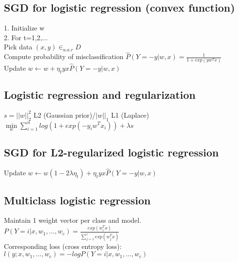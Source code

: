 
\subsection*{SGD for logistic regression (convex function)}
1. Initialize w\\
2. For t=1,2,...\\
Pick data $(x,y) \in_{u.a.r} D$\\
Compute probability of misclassification $\hat{P}(Y = -y|w,x) = \frac{1}{1+exp(yw^Tx)}$\\
Update $w \leftarrow w + \eta_t y x \hat{P}(Y = -y|w,x)$

\subsection*{Logistic regression and regularization}
$s = ||w||_2^2$ L2 (Gaussian prior)/$|w||_1$ L1 (Laplace)\\
$\underset{w}{\operatorname{min}} \sum_{i=1}^n log(1+exp(-y_i w^T x_i)) + \lambda s$

\subsection*{SGD for L2-regularized logistic regression}
Update $w \leftarrow w (1-2\lambda \eta_t) + \eta_t y x \hat{P}(Y = -y|w,x)$

\subsection*{Multiclass logistic regression}
Maintain 1 weight vector per class and model.\\
$P(Y=i|x, w_1,...,w_c) = \frac{exp(w_i^Tx)}{\sum_{j=1}^c exp(w_j^Tx)}$\\
Corresponding loss (cross entropy loss):\\
$l(y;x,w_1,...,w_c)=-logP(Y=i|x, w_1,...,w_c)$
